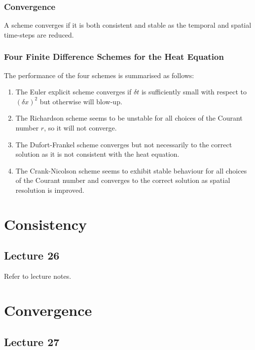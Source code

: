 \documentclass{article}
\begin{document}
\subsubsection{Convergence}
A scheme converges if it is both consistent and stable as the temporal and spatial time-steps are reduced.

\subsubsection{Four Finite Difference Schemes for the Heat Equation}
The performance of the four schemes is summarised as follows:
\begin{enumerate}
    \item The Euler explicit scheme converges if $\delta t$ is sufficiently small with respect to $(\delta x)^2$ but otherwise will blow-up.
    \item The Richardson scheme seems to be unstable for all choices of the Courant number $r$, so it will not converge.
    \item The Dufort-Frankel scheme converges but not necessarily to the correct solution as it is not consistent with the heat equation.
    \item The Crank-Nicolson scheme seems to exhibit stable behaviour for all choices of the Courant number and converges to the correct solution as spatial resolution is improved.
\end{enumerate}


\section{Consistency}
\subsection{Lecture 26}
Refer to lecture notes.


\section{Convergence}
\subsection{Lecture 27}
\end{document}
